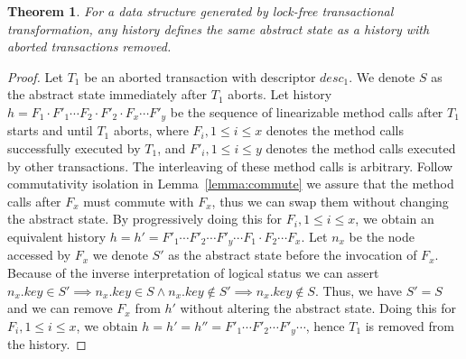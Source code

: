 \documentclass{sig-alternate-05-2015}
\newtheorem{theorem}{Theorem}
\begin{document}
\begin{theorem}
    For a data structure generated by lock-free transactional transformation, any history defines the same abstract state as a history with aborted transactions removed.
\end{theorem}
\begin{proof}
    Let $T_1$ be an aborted transaction with descriptor $desc_1$.
    We denote $S$ as the abstract state immediately after $T_1$ aborts.
    Let history $h = F_1 \cdot F'_1 \cdots F_2 \cdot F'_2 \cdot F_x \cdots F'_y$ be the sequence of linearizable method calls after $T_1$ starts and until $T_1$ aborts, where $F_i, 1 \le i \le x$ denotes the method calls successfully executed by $T_1$, and $F'_i, 1 \le i \le y$ denotes the method calls executed by other transactions.
    The interleaving of these method calls is arbitrary.
    Follow commutativity isolation in Lemma~\ref{lemma:commute} we assure that the method calls after $F_x$ must commute with $F_x$, thus we can swap them without changing the abstract state.
    By progressively doing this for $F_i, 1 \le i \le x$, we obtain an equivalent history $h = h' = F'_1 \cdots F'_2 \cdots F'_y \cdots F_1 \cdot F_2 \cdots F_x$.
    Let $n_x$ be the node accessed by $F_x$
    we denote $S'$ as the abstract state before the invocation of $F_x$. 
    Because of the inverse interpretation of logical status we can assert $n_x.key \in S' \implies n_x.key \in S \land n_x.key \notin S' \implies n_x.key \notin S$.
    Thus, we have $S' = S$ and we can remove $F_x$ from $h'$ without altering the abstract state.
    Doing this for $F_i, 1 \le i \le x$, we obtain $h = h' = h'' =F'_1 \cdots F'_2 \cdots F'_y \cdots$, hence $T_1$ is removed from the history.
\end{proof}
\end{document}
